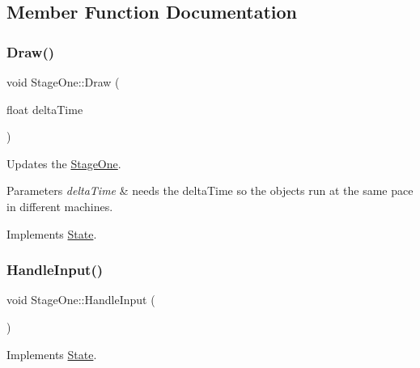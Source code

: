 \subsection{Member Function Documentation}
\mbox{\label{classStageOne_af59dff5e563f4d1f45ea4b8708a3301e}} 
\subsubsection{\texorpdfstring{Draw()}{Draw()}}
{\footnotesize\ttfamily void Stage\+One\+::\+Draw (\begin{DoxyParamCaption}\item[{float}]{delta\+Time }\end{DoxyParamCaption})\hspace{0.3cm}{\ttfamily [virtual]}}



Updates the \mbox{\hyperlink{classStageOne}{Stage\+One}}. 


\begin{DoxyParams}{Parameters}
{\em delta\+Time} & needs the delta\+Time so the objects run at the same pace in different machines. \\
\hline
\end{DoxyParams}


Implements \mbox{\hyperlink{classState_ae3bc988c6103665bca68560742fb40e1}{State}}.

\mbox{\label{classStageOne_a168fa7a88a44900ab5d91bfe87150221}} 
\subsubsection{\texorpdfstring{Handle\+Input()}{HandleInput()}}
{\footnotesize\ttfamily void Stage\+One\+::\+Handle\+Input (\begin{DoxyParamCaption}{ }\end{DoxyParamCaption})\hspace{0.3cm}{\ttfamily [virtual]}}



Implements \mbox{\hyperlink{classState_ad3de659bdeb45c97486464461d625e8f}{State}}.

\mbox{\label{classStageOne_a661f4913ad0f6cc348c19bfa86c0c489}} 
